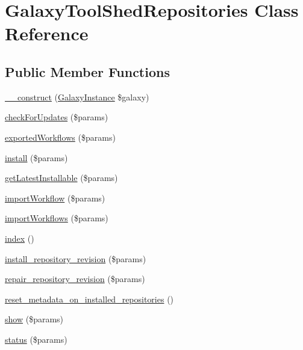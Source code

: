 \hypertarget{classGalaxyToolShedRepositories}{\section{Galaxy\-Tool\-Shed\-Repositories Class Reference}
\label{classGalaxyToolShedRepositories}
}
\subsection*{Public Member Functions}
\begin{DoxyCompactItemize}
\item 
\hyperlink{classGalaxyToolShedRepositories_ad7ff1599fa06976fff3453f14f450d83}{\-\_\-\-\_\-construct} (\hyperlink{classGalaxyInstance}{Galaxy\-Instance} \$galaxy)
\item 
\hyperlink{classGalaxyToolShedRepositories_a8e976f43f27c4dcb35450812b25a0578}{check\-For\-Updates} (\$params)
\item 
\hyperlink{classGalaxyToolShedRepositories_a3d12283816b8b6161a81150f8069d555}{exported\-Workflows} (\$params)
\item 
\hyperlink{classGalaxyToolShedRepositories_a1c0284b38a7d8c683eb29d9c527e3079}{install} (\$params)
\item 
\hyperlink{classGalaxyToolShedRepositories_a6851067068982d942787634ff2aee2f0}{get\-Latest\-Installable} (\$params)
\item 
\hyperlink{classGalaxyToolShedRepositories_abaa004288e2bdb764929d9bc48835d49}{import\-Workflow} (\$params)
\item 
\hyperlink{classGalaxyToolShedRepositories_a555da36018b263d3ef335c90edbc5a86}{import\-Workflows} (\$params)
\item 
\hyperlink{classGalaxyToolShedRepositories_a98ca7dc12a7a0e47d7e58082cd3f8e51}{index} ()
\item 
\hyperlink{classGalaxyToolShedRepositories_a748c96f4db1cab6dbc51edcb8d5590ea}{install\-\_\-repository\-\_\-revision} (\$params)
\item 
\hyperlink{classGalaxyToolShedRepositories_a1fb80afb19a91ecb1e4a79c07a2092fa}{repair\-\_\-repository\-\_\-revision} (\$params)
\item 
\hyperlink{classGalaxyToolShedRepositories_ac03e7b72757917810403d7400989c9c9}{reset\-\_\-metadata\-\_\-on\-\_\-installed\-\_\-repositories} ()
\item 
\hyperlink{classGalaxyToolShedRepositories_a1b1b24f36d192fc054f10ba8b1fda4ee}{show} (\$params)
\item 
\hyperlink{classGalaxyToolShedRepositories_acd00b5719d7911f0670c86af1576743b}{status} (\$params)
\end{DoxyCompactItemize}


